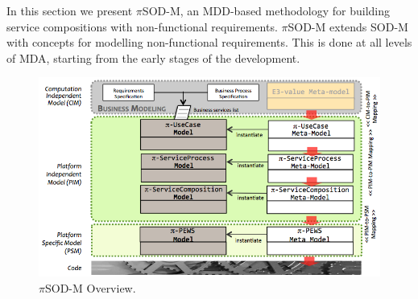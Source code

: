 
In this section we present $\pi$SOD-M, an MDD-based methodology for building service compositions with non-functional requirements. 
$\pi$SOD-M extends SOD-M with concepts for modelling non-functional requirements.
This is done at all levels of MDA, starting from the early stages of the development.

\begin{figure}[h]
\centering
\includegraphics[width=1.0\textwidth]{figs/piSODM}
\caption{$\pi$SOD-M Overview.}
\label{fig:piSOD-M}
\end{figure}

